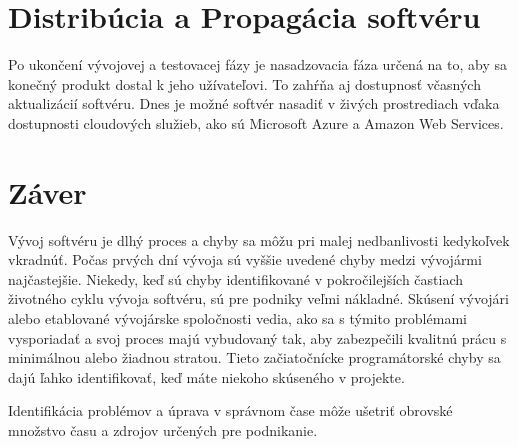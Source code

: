 \documentclass[10pt,twoside,slovak,a4paper]{article}
\begin{document}
\section{Distribúcia a Propagácia softvéru}
Po ukončení vývojovej a testovacej fázy je nasadzovacia fáza určená na to, aby sa konečný produkt dostal k jeho užívateľovi. To zahŕňa aj dostupnosť včasných aktualizácií softvéru. Dnes je možné softvér nasadiť v živých prostrediach vďaka dostupnosti cloudových služieb, ako sú Microsoft Azure a Amazon Web Services.












\section{Záver}
Vývoj softvéru je dlhý proces a chyby sa môžu pri malej nedbanlivosti kedykoľvek vkradnúť. Počas prvých dní vývoja sú vyššie uvedené chyby medzi vývojármi najčastejšie. Niekedy, keď sú chyby identifikované v pokročilejších častiach životného cyklu vývoja softvéru, sú pre podniky veľmi nákladné. Skúsení vývojári alebo etablované vývojárske spoločnosti vedia, ako sa s týmito problémami vysporiadať a svoj proces majú vybudovaný tak, aby zabezpečili kvalitnú prácu s minimálnou alebo žiadnou stratou. Tieto začiatočnícke programátorské chyby sa dajú ľahko identifikovať, keď máte niekoho skúseného v projekte.

Identifikácia problémov a úprava v správnom čase môže ušetriť obrovské množstvo času a zdrojov určených pre podnikanie.
\end{document}
